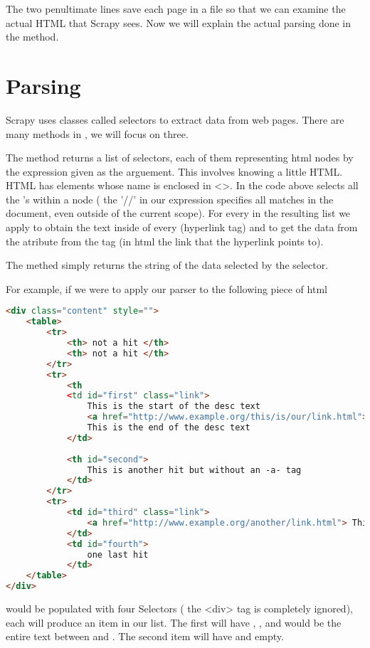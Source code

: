 The two penultimate lines save each page in a file so that we can examine the actual HTML that Scrapy sees.
Now we will explain the actual parsing done in the  method.

\section*{Parsing}
Scrapy uses classes called selectors to extract data from web pages.
There are many methods in , we will focus on three.

The  method returns a list of selectors, each of them representing html nodes by the expression given as the arguement. 
This involves knowing a little HTML. 
HTML has elements whose name is enclosed in <>. 
In the code above  selects  all the 's within a  node ( the '//' in our expression specifies all matches in the document, even outside of the current scope). 
For every  in the resulting list we apply  to obtain the text inside of every  (hyperlink tag) and  to get the data from the  atribute from the  tag (in html the link that the hyperlink points to). 

The  methed simply returns the string of the data selected by the selector.

For example, if we were to apply our parser to the following piece of html

\begin{lstlisting}[language=HTML]
<div class="content" style="">
	<table>
		<tr>
			<th> not a hit </th>
			<th> not a hit </th>
		</tr>
		<tr>
			<th
			<td id="first" class="link">
				This is the start of the desc text
				<a href="http://www.example.org/this/is/our/link.html"> This is our link text</a>
				This is the end of the desc text
			</td>
		
			<th id="second">
				This is another hit but without an -a- tag
			</td>
		</tr>
		<tr>
			<td id="third" class="link">
				<a href="http://www.example.org/another/link.html"> This is our link text</a>
			</td>
			<td id="fourth">
				one last hit
			</td>
	</table>
</div>
\end{lstlisting}
 would be populated with four Selectors ( the <div> tag is completely ignored), each will produce an item in our  list. 
The first will have , , and  would be the entire text between  and . 
The second item will have  and  empty.

